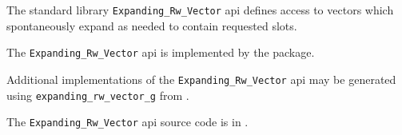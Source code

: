 
The standard library {\tt Expanding\_Rw\_Vector} api defines access to vectors which 
spontaneously expand as needed to contain requested slots.

The {\tt Expanding\_Rw\_Vector} api is implemented by the  package.

Additional implementations of the {\tt Expanding\_Rw\_Vector} api 
may be generated using  
{\tt expanding\_rw\_vector\_g} 
from 
.

The {\tt Expanding\_Rw\_Vector} api source code is in .

